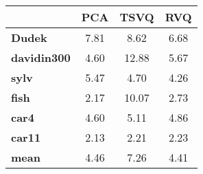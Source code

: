 \begin{tabular}{|l|c|c|c|}
\hline
&\textbf{PCA}&\textbf{TSVQ}&\textbf{RVQ}\\\hline
\textbf{Dudek}&7.81&8.62&6.68\\\hline
\textbf{davidin300}&4.60&12.88&5.67\\\hline
\textbf{sylv}&5.47&4.70&4.26\\\hline
\textbf{fish}&2.17&10.07&2.73\\\hline
\textbf{car4}&4.60&5.11&4.86\\\hline
\textbf{car11}&2.13&2.21&2.23\\\hline
\textbf{mean}&4.46&7.26&4.41\\\hline
\end{tabular}
